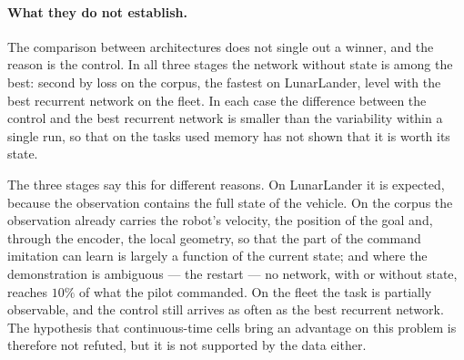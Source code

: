 \paragraph{What they do not establish.}
The comparison between architectures does not single out a winner, and the
reason is the control. In all three stages the network without state is among
the best: second by loss on the corpus, the fastest on LunarLander, level with
the best recurrent network on the fleet. In each case the difference between
the control and the best recurrent network is smaller than the variability
within a single run, so that on the tasks used memory has not shown that it is
worth its state.

The three stages say this for different reasons. On LunarLander it is expected,
because the observation contains the full state of the vehicle. On the corpus
the observation already carries the robot's velocity, the position of the goal
and, through the encoder, the local geometry, so that the part of the command
imitation can learn is largely a function of the current state; and where the
demonstration is ambiguous --- the restart --- no network, with or without state,
reaches $10\%$ of what the pilot commanded. On the fleet the task is partially
observable, and the control still arrives as often as the best recurrent
network. The hypothesis that continuous-time cells bring an advantage on this
problem is therefore not refuted, but it is not supported by the data either.

